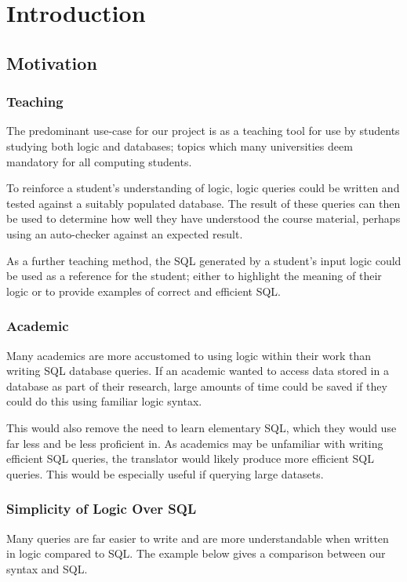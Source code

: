 \documentclass[a4paper, 11pt]{article}
\begin{document}
\section{Introduction}
  \subsection{Motivation}
    \subsubsection{Teaching}
      The predominant use-case for our project is as a teaching tool for use by
      students studying both logic and databases; topics which many universities
      deem mandatory for all computing students.

      To reinforce a student's understanding of logic, logic queries could be
      written and tested against a suitably populated database. The result of
      these queries can then be used to determine how well they have understood
      the course material, perhaps using an auto-checker against an expected
      result.

      As a further teaching method, the SQL generated by a student's input logic
      could be used as a reference for the student; either to highlight the
      meaning of their logic or to provide examples of correct and efficient
      SQL.

    \subsubsection{Academic}
      Many academics are more accustomed to using logic within their work than
      writing SQL database queries. If an academic wanted to access data stored
      in a database as part of their research, large amounts of time could be
      saved if they could do this using familiar logic syntax.

      This would also remove the need to learn elementary SQL, which they would
      use far less and be less proficient in. As academics may be unfamiliar
      with writing efficient SQL queries, the translator would likely produce
      more efficient SQL queries. This would be especially useful if querying
      large datasets.

    \subsubsection{Simplicity of Logic Over SQL}
      Many queries are far easier to write and are more understandable when
      written in logic compared to SQL. The example below gives a comparison
      between our syntax and SQL.
\end{document}
